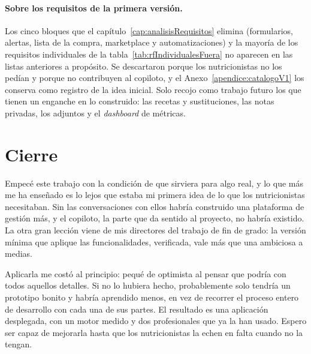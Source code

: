 \paragraph{Sobre los requisitos de la primera versión.} Los cinco bloques que el capítulo~\ref{cap:analisisRequisitos} elimina (formularios, alertas, lista de la compra, marketplace y automatizaciones) y la mayoría de los requisitos individuales de la tabla~\ref{tab:rfIndividualesFuera} no aparecen en las listas anteriores a propósito. Se descartaron porque los nutricionistas no los pedían y porque no contribuyen al copiloto, y el Anexo~\ref{apendice:catalogoV1} los conserva como registro de la idea inicial. Solo recojo como trabajo futuro los que tienen un enganche en lo construido: las recetas y sustituciones, las notas privadas, los adjuntos y el \textit{dashboard} de métricas.

\section{Cierre}
\label{sec:cierre}

Empecé este trabajo con la condición de que sirviera para algo real, y lo que más me ha enseñado es lo lejos que estaba mi primera idea de lo que los nutricionistas necesitaban. Sin las conversaciones con ellos habría construido una plataforma de gestión más, y el copiloto, la parte que da sentido al proyecto, no habría existido. La otra gran lección viene de mis directores del trabajo de fin de grado: la versión mínima que aplique las funcionalidades, verificada, vale más que una ambiciosa a medias.

Aplicarla me costó al principio: pequé de optimista al pensar que podría con todos aquellos detalles. Si no lo hubiera hecho, probablemente solo tendría un prototipo bonito y habría aprendido menos, en vez de recorrer el proceso entero de desarrollo con cada una de sus partes. El resultado es una aplicación desplegada, con un motor medido y dos profesionales que ya la han usado. Espero ser capaz de mejorarla hasta que los nutricionistas la echen en falta cuando no la tengan.
